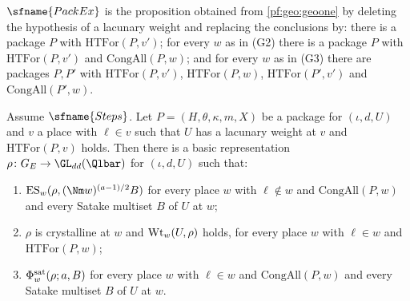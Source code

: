 \begin{definition}[Packages]
\begin{itemize}[nosep]
\end{itemize}
$\sfname{PackEx}$ is the proposition obtained from \cref{pf:geo:geoone} by deleting the hypothesis of a
lacunary weight and replacing the conclusions by: there is a package $P$ with $\mathrm{HTFor}(P,v')$;
for every $w$ as in (G2) there is a package $P$ with $\mathrm{HTFor}(P,v')$ and $\mathrm{CongAll}(P,w)$;
and for every $w$ as in (G3) there are packages $P,P'$ with $\mathrm{HTFor}(P,v')$, $\mathrm{HTFor}(P,w)$,
$\mathrm{HTFor}(P',v')$ and $\mathrm{CongAll}(P',w)$.
\end{definition}

\begin{proposition}\label{pf:geo:packrep}
Assume $\sfname{Steps}$. Let $P=(H,\theta,\kappa,m,X)$ be a package for $(\iota,d,U)$ and $v$ a place with
$\ell\in v$ such that $U$ has a lacunary weight at $v$ and $\mathrm{HTFor}(P,v)$ holds. Then there is a
basic representation $\rho\colon G_E\to\GL_{dd}(\Qlbar)$ for $(\iota,d,U)$ such that:
\begin{enumerate}[label=(\alph*),nosep]
\item $\geoES_w(\rho,(\Nm w)^{(a-1)/2}B)$ for every place $w$ with $\ell\notin w$ and $\mathrm{CongAll}(P,w)$
  and every Satake multiset $B$ of $U$ at $w$;
\item $\rho$ is crystalline at $w$ and $\mathrm{Wt}_w(U,\rho)$ holds, for every place $w$ with $\ell\in w$ and
  $\mathrm{HTFor}(P,w)$;
\item $\Phi^{\mathrm{sat}}_w(\rho;a,B)$ for every place $w$ with $\ell\in w$ and $\mathrm{CongAll}(P,w)$ and
  every Satake multiset $B$ of $U$ at $w$.
\end{enumerate}
\end{proposition}

